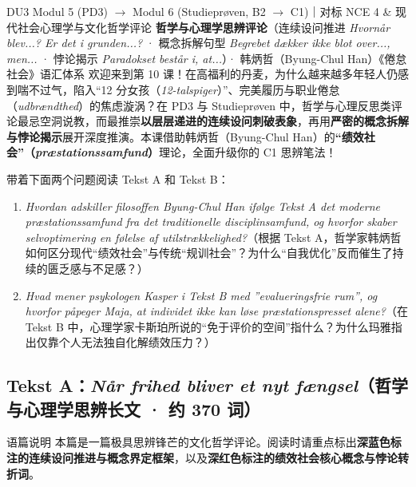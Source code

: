 {DU3 Modul 5 (PD3) $\rightarrow$ Modul 6 (Studieprøven, B2 $\rightarrow$ C1)｜对标 NCE 4 \& 现代社会心理学与文化哲学评论}
{\textbf{哲学与心理学思辨评论}（连续设问推进 \textit{Hvornår blev...? Er det i grunden...?} · 概念拆解句型 \textit{Begrebet dækker ikke blot over..., men...} · 悖论揭示 \textit{Paradokset består i, at...}）· 韩炳哲（Byung-Chul Han）《倦怠社会》语汇体系}
{欢迎来到第 10 课！在高福利的丹麦，为什么越来越多年轻人仍感到喘不过气，陷入“12 分女孩（\textit{12-talspiger}）”、完美履历与职业倦怠（\textit{udbrændthed}）的焦虑漩涡？在 PD3 与 Studieprøven 中，哲学与心理反思类评论最忌空洞说教，而最推崇\textbf{以层层递进的连续设问刺破表象}，再用\textbf{严密的概念拆解与悖论揭示}展开深度推演。本课借助韩炳哲（Byung-Chul Han）的\textbf{“绩效社会”（\textit{præstationssamfund}）}理论，全面升级你的 C1 思辨笔法！}

\begin{foerduleaeser}
带着下面两个问题阅读 Tekst A 和 Tekst B：
\begin{enumerate}
  \item \textit{Hvordan adskiller filosoffen Byung-Chul Han ifølge Tekst A det moderne præstationssamfund fra det traditionelle disciplinsamfund, og hvorfor skaber selvoptimering en følelse af utilstrækkelighed?}（根据 Tekst A，哲学家韩炳哲如何区分现代“绩效社会”与传统“规训社会”？为什么“自我优化”反而催生了持续的匮乏感与不足感？）
  \item \textit{Hvad mener psykologen Kasper i Tekst B med ”evalueringsfrie rum”, og hvorfor påpeger Maja, at individet ikke kan løse præstationspresset alene?}（在 Tekst B 中，心理学家卡斯珀所说的“免于评价的空间”指什么？为什么玛雅指出仅靠个人无法独自化解绩效压力？）
\end{enumerate}
\end{foerduleaeser}


\subsection*{Tekst A：\textit{Når frihed bliver et nyt fængsel}（哲学与心理学思辨长文 · 约 370 词）}

\begin{tipbox}{语篇说明}
本篇是一篇极具思辨锋芒的文化哲学评论。阅读时请重点标出\textbf{\color{NCDNavy}深蓝色标注的连续设问推进与概念界定框架}，以及\textbf{\color{NCDRed}深红色标注的绩效社会核心概念与悖论转折词}。
\end{tipbox}

